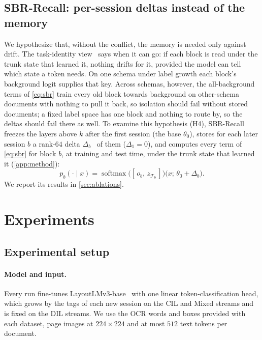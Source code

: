 \documentclass[10pt,twocolumn,letterpaper]{article}
\begin{document}
\subsection{SBR-Recall: per-session deltas instead of the memory}
\label{sec:recall}
We hypothesize that, without the conflict, the memory is needed only against drift. The task-identity view~\citep{kim2022theoretical} says when it can go: if each block is read under the trunk state that learned it, nothing drifts for it, provided the model can tell which state a token needs. On one schema under label growth each block's background logit supplies that key. Across schemas, however, the all-background terms of \cref{eq:sbr} train every old block towards background on other-schema documents with nothing to pull it back, so isolation should fail without stored documents; a fixed label space has one block and nothing to route by, so the deltas should fail there as well. To examine this hypothesis (H4), SBR-Recall freezes the layers above $k$ after the first session (the base $\theta_0$), stores for each later session $b$ a rank-$64$ delta $\Delta_b$~\citep{hu2022lora} of them ($\Delta_1{=}0$), and computes every term of \cref{eq:sbr} for block $b$, at training and test time, under the trunk state that learned it (\cref{app:method}):
\begin{equation}
p_b(\cdot\mid x)=\operatorname{softmax}\big([\,o_b,\,z_{\mathcal{T}_b}\,]\big)\big(x;\,\theta_0+\Delta_b\big).
\label{eq:recall}
\end{equation}
We report its results in \cref{sec:ablations}.

\section{Experiments}
\label{sec:experiments}
\subsection{Experimental setup}
\paragraph{Model and input.} Every run fine-tunes LayoutLMv3-base~\citep{huang2022layoutlmv3} with one linear token-classification head, which grows by the tags of each new session on the CIL and Mixed streams and is fixed on the DIL streams. We use the OCR words and boxes provided with each dataset, page images at $224{\times}224$ and at most $512$ text tokens per document.
\end{document}
